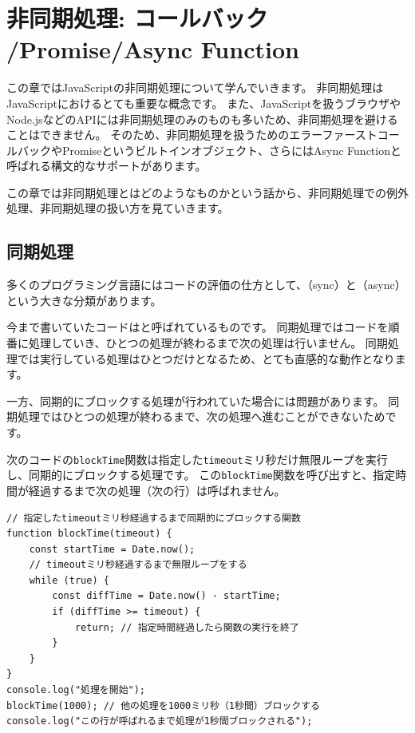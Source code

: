\hypertarget{async-handling}{%
\chapter[非同期処理: コールバック /Promise/Async Function]{非同期処理: コールバック\\ /Promise/Async
Function}\label{async-handling}}
\thispagestyle{frontheadings}

この章ではJavaScriptの非同期処理について学んでいきます。
非同期処理はJavaScriptにおけるとても重要な概念です。
また、JavaScriptを扱うブラウザやNode.jsなどのAPIには非同期処理のみのものも多いため、非同期処理を避けることはできません。
そのため、非同期処理を扱うためのエラーファーストコールバックやPromiseというビルトインオブジェクト、さらにはAsync
Functionと呼ばれる構文的なサポートがあります。

この章では非同期処理とはどのようなものかという話から、非同期処理での例外処理、非同期処理の扱い方を見ていきます。

\hypertarget{sync-processing}{%
\section{同期処理}\label{sync-processing}}

多くのプログラミング言語にはコードの評価の仕方として、\textbf{}（sync）と\textbf{}（async）という大きな分類があります。

今まで書いていたコードは\textbf{}と呼ばれているものです。
同期処理ではコードを順番に処理していき、ひとつの処理が終わるまで次の処理は行いません。
同期処理では実行している処理はひとつだけとなるため、とても直感的な動作となります。

一方、同期的にブロックする処理が行われていた場合には問題があります。
同期処理ではひとつの処理が終わるまで、次の処理へ進むことができないためです。

次のコードの\texttt{blockTime}関数は指定した\texttt{timeout}ミリ秒だけ無限ループを実行し、同期的にブロックする処理です。
この\texttt{blockTime}関数を呼び出すと、指定時間が経過するまで次の処理（次の行）は呼ばれません。

\begin{lstlisting}
// 指定したtimeoutミリ秒経過するまで同期的にブロックする関数
function blockTime(timeout) { 
    const startTime = Date.now();
    // timeoutミリ秒経過するまで無限ループをする
    while (true) {
        const diffTime = Date.now() - startTime;
        if (diffTime >= timeout) {
            return; // 指定時間経過したら関数の実行を終了
        }
    }
}
console.log("処理を開始");
blockTime(1000); // 他の処理を1000ミリ秒（1秒間）ブロックする
console.log("この行が呼ばれるまで処理が1秒間ブロックされる");
\end{lstlisting}

